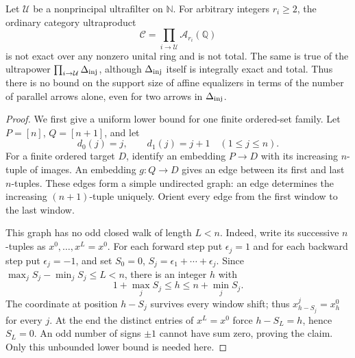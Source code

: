 \begin{theorem}
\label{C4:ultraproduct-exclusion}
Let $\mathcal U$ be a nonprincipal ultrafilter on $\mathbb N$.
For arbitrary integers $r_i\geq2$, the ordinary category
ultraproduct
\[
 \mathcal C=\prod_{i\to\mathcal U}\mathcal A_{r_i}(\mathbb Q)
\]
is not exact over any nonzero unital ring and is not total. The same is
true of the ultrapower $\prod_{i\to\mathcal U}\Delta_{\rm inj}$,
although $\Delta_{\rm inj}$ itself is integrally exact and total.
Thus there is no bound on the support size of affine
equalizers in terms of the number of parallel arrows alone, even
for two arrows in $\Delta_{\rm inj}$.
\end{theorem}
\begin{proof}
We first give a uniform lower bound for one finite ordered-set
family. Let $P=[n]$, $Q=[n+1]$, and let
\[
 d_0(j)=j,\qquad d_1(j)=j+1 \quad (1\leq j\leq n).
 \tag{UP.1}
\]
For a finite ordered target $D$, identify an embedding
$P\to D$ with its increasing $n$-tuple of images. An embedding
$g:Q\to D$ gives an edge between its first and last $n$-tuples.
These edges form a simple undirected graph: an edge determines
the increasing $(n+1)$-tuple uniquely. Orient every edge from
the first window to the last window.

This graph has no odd closed walk of length $L<n$. Indeed,
write its successive $n$-tuples as $x^0,\ldots,x^L=x^0$.
For each forward step put $\epsilon_j=1$ and for each backward
step put $\epsilon_j=-1$, and set
$S_0=0$, $S_j=\epsilon_1+\cdots+\epsilon_j$. Since
$\max_j S_j-\min_j S_j\leq L<n$, there is an integer $h$ with
\[
 1+\max_j S_j\leq h\leq n+\min_j S_j.
\]
The coordinate at position $h-S_j$ survives every window shift;
thus $x^j_{h-S_j}=x^0_h$ for every $j$. At the end the distinct
entries of $x^L=x^0$ force $h-S_L=h$, hence $S_L=0$.
An odd number of signs $\pm1$ cannot have sum zero, proving the
claim. Only this unbounded lower bound is needed here.


\end{proof}
